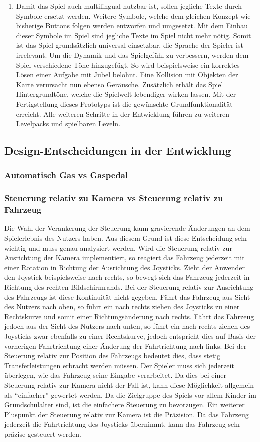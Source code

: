 \begin{enumerate}[label=Prototyp \arabic*]
		\item{ Damit das Spiel auch multilingual nutzbar ist, sollen jegliche Texte durch Symbole ersetzt werden. Weitere Symbole, welche dem gleichen Konzept wie bisherige Buttons folgen werden entworfen und umgesetzt. Mit dem Einbau dieser Symbole im Spiel sind jegliche Texte im Spiel nicht mehr nötig. Somit ist das Spiel grundsätzlich universal einsetzbar, die Sprache der Spieler ist irrelevant. Um die Dynamik und das Spielgefühl zu verbessern, werden dem Spiel verschiedene Töne hinzugefügt. So wird beispielsweise ein korrektes Lösen einer Aufgabe mit Jubel belohnt. Eine Kollision mit Objekten der Karte verursacht nun ebenso Geräusche. Zusätzlich erhält das Spiel Hintergrundtöne, welche die Spielwelt lebendiger wirken lassen. Mit der Fertigstellung dieses Prototyps ist die gewünschte Grundfunktionalität erreicht. Alle weiteren Schritte in der Entwicklung führen zu weiteren Levelpacks und spielbaren Leveln.}
	\end{enumerate}
\subsection{Design-Entscheidungen in der Entwicklung}
	\subsubsection{Automatisch Gas vs Gaspedal}
	\subsubsection{Steuerung relativ zu Kamera vs Steuerung relativ zu Fahrzeug}
	Die Wahl der Verankerung der Steuerung kann gravierende Änderungen an dem Spielerlebnis des Nutzers haben. Aus diesem Grund ist diese Entscheidung sehr wichtig und muss genau analysiert werden.
	Wird die Steuerung relativ zur Ausrichtung der Kamera implementiert, so reagiert das Fahrzeug jederzeit mit einer Rotation in Richtung der Ausrichtung des Joysticks. Zieht der Anwender den Joystick beispielsweise nach rechts, so bewegt sich das Fahrzeug jederzeit in Richtung des rechten Bildschirmrands. Bei der Steuerung relativ zur Ausrichtung des Fahrzeugs ist diese Kontinuität nicht gegeben. Fährt das Fahrzeug aus Sicht des Nutzers nach oben, so führt ein nach rechts ziehen des Joysticks zu einer Rechtskurve und somit einer Richtungsänderung nach rechts.
	Fährt das Fahrzeug jedoch aus der Sicht des Nutzers nach unten, so führt ein nach rechts ziehen des Joysticks zwar ebenfalls zu einer Rechtskurve, jedoch entspricht dies auf Basis der vorherigen Fahrtrichtung einer Änderung der Fahrtrichtung nach links.
	Bei der Steuerung relativ zur Position des Fahrzeugs bedeutet dies, dass stetig Transferleistungen erbracht werden müssen. Der Spieler muss sich jederzeit überlegen, wie das Fahrzeug seine Eingabe verarbeitet. Da dies bei einer Steuerung relativ zur Kamera nicht der Fall ist, kann diese Möglichkeit allgemein als \enquote{einfacher} gewertet werden. Da die Zielgruppe des Spiels vor allem Kinder im Grundschulalter sind, ist die einfachere Steuerung zu bevorzugen. Ein weiterer Pluspunkt der Steuerung relativ zur Kamera ist die Präzision. Da das Fahrzeug jederzeit die Fahrtrichtung des Joysticks übernimmt, kann das Fahrzeug sehr präzise gesteuert werden.
